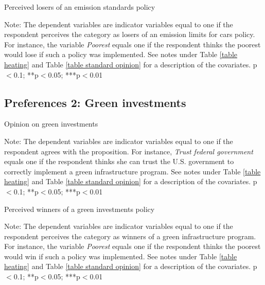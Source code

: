\documentclass{article}
\begin{document}
\begin{table}[h!]
	\caption{Perceived losers of an emission standards policy}
	\begin{center}
		\scalebox{0.7}{}
	\end{center}
	{\footnotesize Note: The dependent variables are indicator variables equal to one if the respondent perceives the category as losers of an emission limits for cars policy. For instance, the variable \textit{Poorest} equals one if the respondent thinks the poorest would lose if such a policy was implemented. See notes under Table \ref{table heating} and Table \ref{table standard opinion} for a description of the covariates.
	\newline *p$<$0.1; **p$<$0.05; ***p$<$0.01}
\end{table}	

\clearpage
\subsection{Preferences 2: Green investments}

\begin{table}[h!]
	\caption{Opinion on green investments}
	\begin{center}
		\scalebox{0.7}{}
	\end{center}
	{\footnotesize Note: The dependent variables are indicator variables equal to one if the respondent agrees with the proposition. For instance, \textit{Trust federal government} equals one if the respondent thinks she can trust the U.S. government to correctly implement a green infrastructure program. See notes under Table \ref{table heating} and Table \ref{table standard opinion} for a description of the covariates.
	\newline *p$<$0.1; **p$<$0.05; ***p$<$0.01}
\end{table}	

\begin{table}[h!]
	\caption{Perceived winners of a green investments policy}
	\begin{center}
		\scalebox{0.7}{}
	\end{center}
	{\footnotesize Note: The dependent variables are indicator variables equal to one if the respondent perceives the category as winners of a green infrastructure program. For instance, the variable \textit{Poorest} equals one if the respondent thinks the poorest would win if such a policy was implemented. See notes under Table \ref{table heating} and Table \ref{table standard opinion} for a description of the covariates.
	\newline *p$<$0.1; **p$<$0.05; ***p$<$0.01}
\end{table}	
\end{document}
